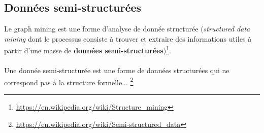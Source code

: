 	\subsection{Données semi-structurées}
	\begin{frame}
		Le graph mining est une forme d'analyse de donnée structurée (\textit{structured data mining} dont le processus consiste à trouver et extraire des informations utiles à partir d'une masse de \textbf{données semi-structurées})\footnote{\href{https://en.wikipedia.org/wiki/Structure\_mining}{https://en.wikipedia.org/wiki/Structure\_mining}}.\\~\\
		\pause
		Une donnée semi-structurée est une forme de données structurées qui ne correspond pas à la structure formelle... \footnote{\href{https://en.wikipedia.org/wiki/Semi-structured\_data}{https://en.wikipedia.org/wiki/Semi-structured\_data}}
	\end{frame}

